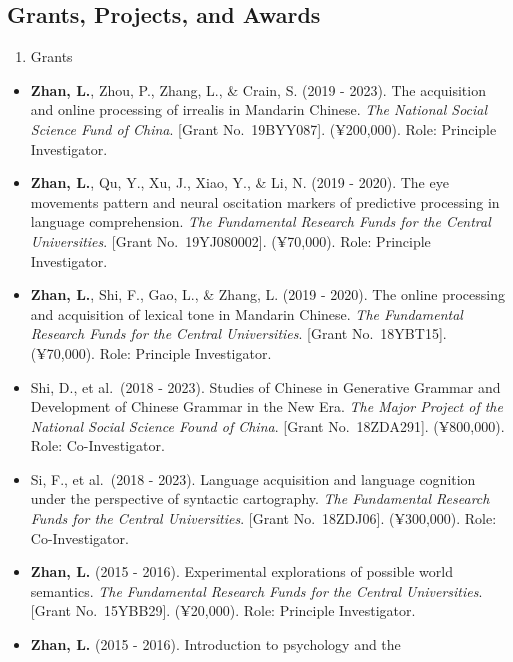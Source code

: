 \documentclass[
  12pt,
]{article}
\providecommand{\tightlist}{%
  \setlength{\itemsep}{0pt}\setlength{\parskip}{0pt}}
\begin{document}
\hypertarget{grants-projects-and-awards}{%
\subsection{Grants, Projects, and
Awards}\label{grants-projects-and-awards}}

\begin{enumerate}
\def\labelenumi{\arabic{enumi}.}
\tightlist
\item
  Grants
\end{enumerate}

\begin{itemize}
\item
  \textbf{Zhan, L.}, Zhou, P., Zhang, L., \& Crain, S. (2019 - 2023).
  The acquisition and online processing of irrealis in Mandarin Chinese.
  \emph{The National Social Science Fund of China}. {[}Grant
  No.~19BYY087{]}. (¥200,000). Role: Principle Investigator.
\item
  \textbf{Zhan, L.}, Qu, Y., Xu, J., Xiao, Y., \& Li, N. (2019 - 2020).
  The eye movements pattern and neural oscitation markers of predictive
  processing in language comprehension. \emph{The Fundamental Research
  Funds for the Central Universities}. {[}Grant No.~19YJ080002{]}.
  (¥70,000). Role: Principle Investigator.
\item
  \textbf{Zhan, L.}, Shi, F., Gao, L., \& Zhang, L. (2019 - 2020). The
  online processing and acquisition of lexical tone in Mandarin Chinese.
  \emph{The Fundamental Research Funds for the Central Universities}.
  {[}Grant No.~18YBT15{]}. (¥70,000). Role: Principle Investigator.
\item
  Shi, D., et al.~(2018 - 2023). Studies of Chinese in Generative
  Grammar and Development of Chinese Grammar in the New Era. \emph{The
  Major Project of the National Social Science Found of China}. {[}Grant
  No.~18ZDA291{]}. (¥800,000). Role: Co-Investigator.
\item
  Si, F., et al.~(2018 - 2023). Language acquisition and language
  cognition under the perspective of syntactic cartography. \emph{The
  Fundamental Research Funds for the Central Universities}. {[}Grant
  No.~18ZDJ06{]}. (¥300,000). Role: Co-Investigator.
\item
  \textbf{Zhan, L.} (2015 - 2016). Experimental explorations of possible
  world semantics. \emph{The Fundamental Research Funds for the Central
  Universities}. {[}Grant No.~15YBB29{]}. (¥20,000). Role: Principle
  Investigator.
\item
  \textbf{Zhan, L.} (2015 - 2016). Introduction to psychology and the

\end{itemize}
\end{document}
